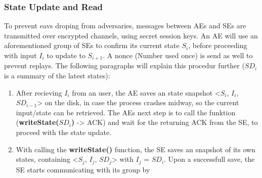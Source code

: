 \subsubsection{State Update and Read}

To prevent eavs droping from adversaries, messages between AEs and SEs are transmitted over encrypted channels, using secret session keys. An AE will use an aforementioned group of SEs to confirm its current state \(S_i\), before proceeding with input \(I_i\) to update to \(S_{i+1}\). A nonce (Number used once) is send as well to prevent replays. The following paragraphs will explain this procedur further (\(SD_{i}\) is a summary of the latest states):

\begin{enumerate}
    \item After recieving \(I_i\) from an user, the AE saves an state snapshot <\(S_i\), \(I_i\), \(SD_{i-1}\)> on the disk, in case the process crashes midway, so the current input/state can be retrieved. The AEs next step is to call the funktion (\textbf{writeState(\(SD_i\))} -> ACK) and wait for the returning ACK from the SE, to proceed with the state update.
    \item With calling the \textbf{writeState()} function, the SE saves an snapshot of its own states, containing <\(S_j\), \(I_j\), \(SD_j\)> with \(I_j\) = \(SD_{i}\). Upon a successfull save, the SE starts communicating with its group by 
\end{enumerate}